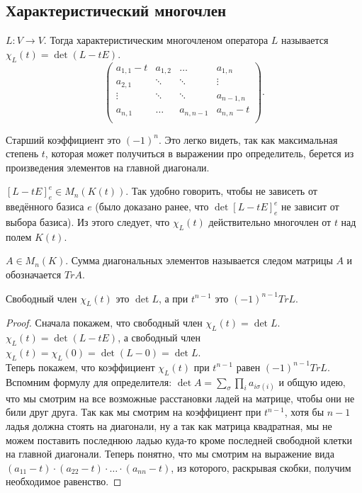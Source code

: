 \subsection{Характеристический многочлен}
\begin{definition}
    $L\colon V\rightarrow V$. Тогда характеристическим многочленом
    оператора $L$ называется $\chi_L(t) = \det(L - tE)$.
    \[
        \begin{pmatrix}
            a_{1,1}-t&a_{1,2}&\dots&a_{1,n}\\
            a_{2,1} & \ddots & \ddots& \vdots\\
            \vdots & \ddots & \ddots& a_{n-1,n}\\
            a_{n,1} & \dots & a_{n,n-1}& a_{n,n}-t\\
        \end{pmatrix}
    .\] 
\end{definition}
\begin{remark}
    Старший коэффициент это $(-1)^n$. Это легко видеть, так как максимальная степень $t$, которая может получиться в выражении про определитель, берется из произведения элементов на главной диагонали.
\end{remark}
\begin{remark}
    $[L - tE]^e_e \in M_n(K(t))$. Так удобно говорить, чтобы не зависеть от введённого базиса $e$ (было доказано ранее, что $\det [L - t E]^e_e$ не зависит от выбора базиса).
    Из этого следует, что $\chi_L(t)$ действительно многочлен от $t$ над полем $K(t)$.
\end{remark}
\begin{definition}
    $A\in M_n(K)$. Сумма диагональных элементов называется следом матрицы $A$ и обозначается $Tr A$.
\end{definition}
\begin{remark}
    Свободный член $\chi_L(t)$ это $\det L$, а при $t^{n-1}$ это $(-1)^{n-1}Tr L$.
\end{remark}
\begin{proof} Сначала покажем, что свободный член $\chi_L(t) = \det L$. \\ $\chi_L(t) = \det (L - t E)$, а свободный член $\chi_L(t) = \chi_L(0) = \det (L - 0) = \det L$. \\
Теперь покажем, что коэффициент $\chi_L(t)$ при $t^{n - 1}$ равен $(-1)^{n - 1}Tr L$. \\
Вспомним формулу для определителя: $\det A = \sum\limits_\sigma \prod\limits_i a_{i\sigma(i)}$ и общую идею, что мы смотрим на все возможные расстановки ладей на матрице, чтобы они не били друг друга. Так как мы смотрим на коэффициент при $t^{n - 1}$, хотя бы $n - 1$ ладья должна стоять на диагонали, ну а так как матрица квадратная, мы не можем поставить последнюю ладью куда-то кроме последней свободной клетки на главной диагонали. Теперь понятно, что мы смотрим на выражение вида $(a_{1 1} - t)\cdot(a_{2 2} - t)\cdot \dots \cdot (a_{n n} - t)$, из которого, раскрывая скобки, получим необходимое равенство.
\end{proof}
